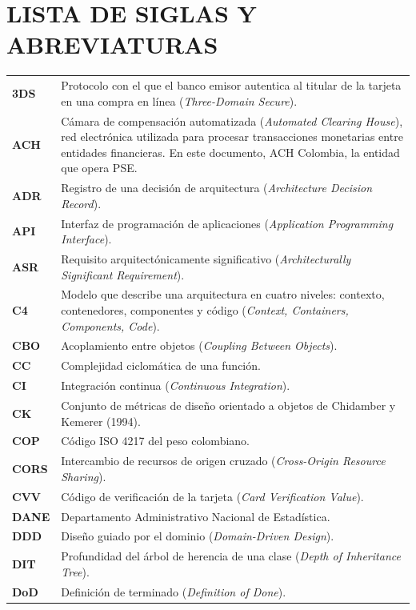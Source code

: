 \section*{LISTA DE SIGLAS Y ABREVIATURAS}

{\renewcommand{\arraystretch}{1.15}
\begin{longtable}{@{}>{\bfseries}p{2.4cm}p{12.6cm}@{}}
3DS & Protocolo con el que el banco emisor autentica al titular de la tarjeta en una compra en línea (\textit{Three-Domain Secure}). \\
ACH & Cámara de compensación automatizada (\textit{Automated Clearing House}), red electrónica utilizada para procesar transacciones monetarias entre entidades financieras. En este documento, ACH Colombia, la entidad que opera PSE. \\
ADR & Registro de una decisión de arquitectura (\textit{Architecture Decision Record}). \\
API & Interfaz de programación de aplicaciones (\textit{Application Programming Interface}). \\
ASR & Requisito arquitectónicamente significativo (\textit{Architecturally Significant Requirement}). \\
C4 & Modelo que describe una arquitectura en cuatro niveles: contexto, contenedores, componentes y código (\textit{Context, Containers, Components, Code}). \\
CBO & Acoplamiento entre objetos (\textit{Coupling Between Objects}). \\
CC & Complejidad ciclomática de una función. \\
CI & Integración continua (\textit{Continuous Integration}). \\
CK & Conjunto de métricas de diseño orientado a objetos de Chidamber y Kemerer (1994). \\
COP & Código ISO 4217 del peso colombiano. \\
CORS & Intercambio de recursos de origen cruzado (\textit{Cross-Origin Resource Sharing}). \\
CVV & Código de verificación de la tarjeta (\textit{Card Verification Value}). \\
DANE & Departamento Administrativo Nacional de Estadística. \\
DDD & Diseño guiado por el dominio (\textit{Domain-Driven Design}). \\
DIT & Profundidad del árbol de herencia de una clase (\textit{Depth of Inheritance Tree}). \\
DoD & Definición de terminado (\textit{Definition of Done}). \\

\end{longtable}}
